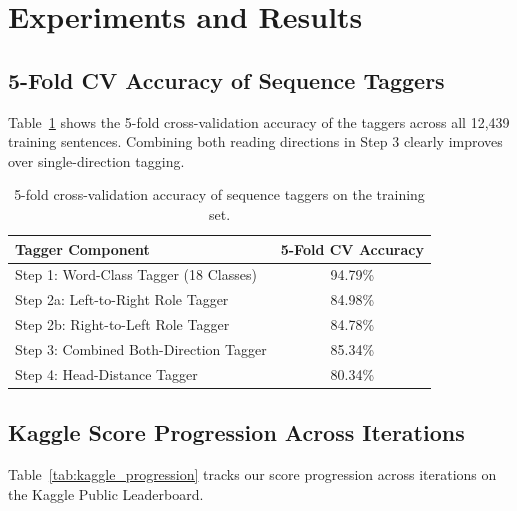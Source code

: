 \documentclass[11pt,a4paper]{article}
\begin{document}
\section{Experiments and Results}

\subsection{5-Fold CV Accuracy of Sequence Taggers}
Table~\ref{tab:tagger_cv} shows the 5-fold cross-validation accuracy of the taggers across all 12,439 training sentences. Combining both reading directions in Step 3 clearly improves over single-direction tagging.

\begin{table}[H]
\centering
\caption{5-fold cross-validation accuracy of sequence taggers on the training set.}
\label{tab:tagger_cv}
\begin{tabular}{@{}lc@{}}
\toprule
\textbf{Tagger Component} & \textbf{5-Fold CV Accuracy} \\
\midrule
Step 1: Word-Class Tagger (18 Classes) & 94.79\% \\
Step 2a: Left-to-Right Role Tagger & 84.98\% \\
Step 2b: Right-to-Left Role Tagger & 84.78\% \\
Step 3: Combined Both-Direction Tagger & 85.34\% \\
Step 4: Head-Distance Tagger & 80.34\% \\
\bottomrule
\end{tabular}
\end{table}

\subsection{Kaggle Score Progression Across Iterations}
Table~\ref{tab:kaggle_progression} tracks our score progression across iterations on the Kaggle Public Leaderboard.
\end{document}
